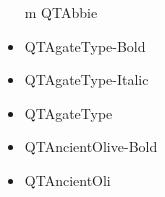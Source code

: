 \documentclass[12pt]{article}
\begin{document}
\begin{itemize}
m QTAbbie\item QTAgateType-Bold\item QTAgateType-Italic\item QTAgateType\item QTAncientOlive-Bold\item QTAncientOli
\end{itemize}
\end{document}

